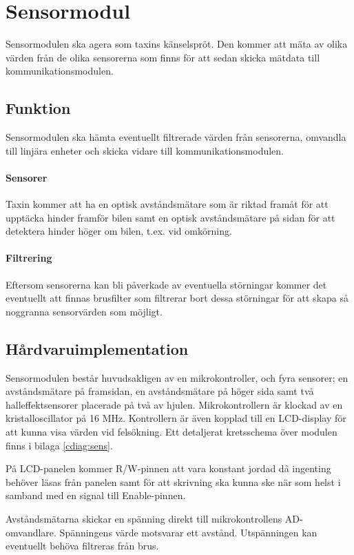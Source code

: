 \documentclass[designspec/spec.tex]{subfiles}
\begin{document}
\section{Sensormodul}
Sensormodulen ska agera som taxins känselspröt. Den kommer att mäta av olika
värden från de olika sensorerna som finns för att sedan skicka mätdata till
kommunikationsmodulen.

\subsection{Funktion}
Sensormodulen ska hämta eventuellt filtrerade värden från sensorerna, omvandla
till linjära enheter och skicka vidare till kommunikationsmodulen.

\paragraph{Sensorer}
Taxin kommer att ha en optisk avståndsmätare som är riktad framåt för att
upptäcka hinder framför bilen samt en optisk avståndsmätare på sidan för att
detektera hinder höger om bilen, t.ex. vid omkörning.

\paragraph{Filtrering} Eftersom sensorerna kan bli påverkade av eventuella
störningar kommer det eventuellt att finnas brusfilter som filtrerar bort dessa
störningar för att skapa så noggranna sensorvärden som möjligt.

\subsection{Hårdvaruimplementation}
Sensormodulen består huvudsakligen av en mikrokontroller, och fyra sensorer; en
avståndsmätare på framsidan, en avståndsmätare på höger sida samt två
halleffektsensorer placerade på två av hjulen. Mikrokontrollern är klockad av
en kristalloscillator på 16 MHz. Kontrollern är även kopplad till en
LCD-display för att kunna visa värden vid felsökning. Ett detaljerat
kretsschema över modulen finns i bilaga \ref{cdiag:sens}.

På LCD-panelen kommer R/W-pinnen att vara konstant jordad då ingenting behöver
läsas från panelen samt för att skrivning ska kunna ske när som helst i samband
med en signal till Enable-pinnen.

Avståndsmätarna skickar en spänning direkt till mikrokontrollens AD-omvandlare.
Spänningens värde motsvarar ett avstånd. Utspänningen kan eventuellt behöva
filtreras från brus.
\end{document}
